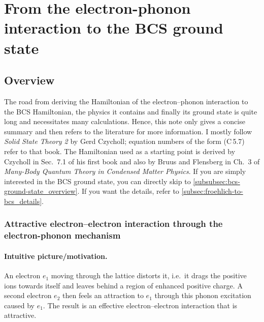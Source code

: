 \documentclass[../../main.tex]{subfiles}
\begin{document}
\section{From the electron-phonon interaction to the BCS ground state}
\label{sec:froehlich-to-bcs}

\subsection{Overview} \label{subsec:froehlich-to-bcs_overview}

The road from deriving the Hamiltonian of the electron--phonon interaction to the BCS
Hamiltonian, the physics it contains and finally its ground state is quite long and
necessitates many calculations. Hence, this note only gives a concise summary and then
refers to the literature for more information. I mostly follow \emph{Solid State Theory 2}
by Gerd Czycholl; equation numbers of the form (C\,5.7) refer to that book. The
Hamiltonian used as a starting point is derived by Czycholl in Sec.~7.1 of his first book
and also by Bruus and Flensberg in Ch.~3 of \emph{Many-Body Quantum Theory in Condensed
Matter Physics}. If you are simply interested in the BCS ground state, you can directly
skip to \cref{subsubsec:bcs-ground-state_overview}. If you want the details, refer to \cref{subsec:froehlich-to-bcs_details}.

\subsubsection{Attractive electron--electron interaction through the electron-phonon
mechanism}
\label{subsubsec:attractive-interaction_overview}

\paragraph{Intuitive picture/motivation.}
An electron $e_1$ moving through the lattice distorts it, i.e.\ it drags the positive ions
towards itself and leaves behind a region of enhanced positive charge. A second electron
$e_2$ then feels an attraction to $e_1$ through this phonon excitation caused by $e_1$.
The result is an effective electron--electron interaction that is attractive.
\end{document}
